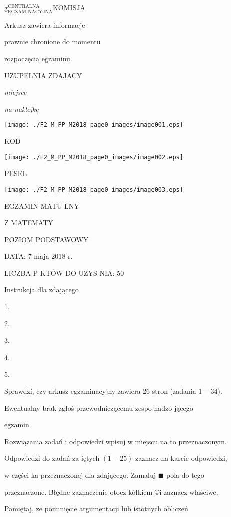 \documentclass[a4paper,12pt]{article}
\begin{document}
$\mathrm{g}_{\mathrm{E}\mathrm{G}\mathrm{Z}\mathrm{A}\mathrm{M}\mathrm{I}\mathrm{N}\mathrm{A}\mathrm{C}\mathrm{Y}\mathrm{J}\mathrm{N}\mathrm{A}}^{\mathrm{C}\mathrm{E}\mathrm{N}\mathrm{T}\mathrm{R}\mathrm{A}\mathrm{L}\mathrm{N}\mathrm{A}}$KOMISJA

Arkusz zawiera informacje

prawnie chronione do momentu

rozpoczęcia egzaminu.

UZUPELNIA ZDAJACY

{\it miejsce}

{\it na naklejkę}
\begin{center}
\texttt{[image: ./F2\_M\_PP\_M2018\_page0\_images/image001.eps]}
\end{center}
KOD
\begin{center}
\texttt{[image: ./F2\_M\_PP\_M2018\_page0\_images/image002.eps]}
\end{center}
PESEL
\begin{center}
\texttt{[image: ./F2\_M\_PP\_M2018\_page0\_images/image003.eps]}
\end{center}
EGZAMIN MATU  LNY

Z MATEMATY

POZIOM PODSTAWOWY

DATA: 7 maja 2018 $\mathrm{r}.$

LICZBA P KTÓW DO UZYS NIA: 50

Instrukcja dla zdającego

1.

2.

3.

4.

5.

Sprawdzí, czy arkusz egzaminacyjny zawiera 26 stron (zadania $1-34$).

Ewentualny brak zgłoś przewodniczącemu zespo nadzo jącego

egzamin.

Rozwiązania zadań i odpowiedzi wpisuj w miejscu na to przeznaczonym.

Odpowiedzi do zadań za iętych $(1-25)$ zaznacz na karcie odpowiedzi,

w części ka przeznaczonej dla zdającego. Zamaluj $\blacksquare$ pola do tego

przeznaczone. Błędne zaznaczenie otocz kółkiem \copyright i zaznacz właściwe.

Pamiętaj, $\dot{\mathrm{z}}\mathrm{e}$ pominięcie argumentacji lub istotnych obliczeń
\end{document}
